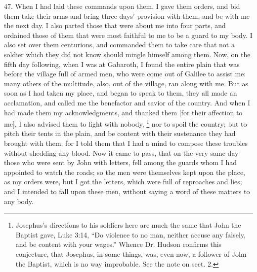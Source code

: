 47. When I had laid these commands upon them, I gave them orders, and bid
them take their arms and bring three days' provision with them, and be
with me the next day. I also parted those that were about me into four
parts, and ordained those of them that were most faithful to me to be a
guard to my body. I also set over them centurions, and commanded them to
take care that not a soldier which they did not know should mingle himself
among them. Now, on the fifth day following, when I was at Gabaroth, I
found the entire plain that was before the village full of armed men, who
were come out of Galilee to assist me: many others of the multitude, also,
out of the village, ran along with me. But as soon as I had taken my
place, and began to speak to them, they all made an acclamation, and
called me the benefactor and savior of the country. And when I had made
them my acknowledgments, and thanked them [for their affection to me], I
also advised them to fight with nobody, \footnote{Josephus's directions to
his soldiers here are much the same that John the Baptist gave, Luke 3:14,
``Do violence to no man, neither accuse any falsely, and be content with
your wages.'' Whence Dr. Hudson confirms this conjecture, that Josephus, in
some things, was, even now, a follower of John the Baptist, which is no
way improbable. See the note on sect. 2.} nor to
spoil the country; but to pitch their tents in the plain, and be content
with their sustenance they had brought with them; for I told them that I
had a mind to compose these troubles without shedding any blood. Now it
came to pass, that on the very same day those who were sent by John with
letters, fell among the guards whom I had appointed to watch the roads; so
the men were themselves kept upon the place, as my orders were, but I got
the letters, which were full of reproaches and lies; and I intended to
fall upon these men, without saying a word of these matters to any body.

